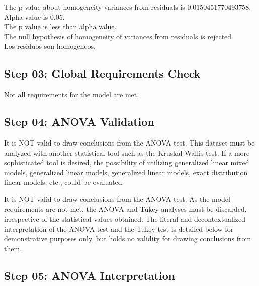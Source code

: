 \documentclass[
  letterpaper,
  DIV=11,
  numbers=noendperiod]{scrartcl}
\begin{document}
The p value about homogeneity variances from residuals is
0.0150451770493758.\\
Alpha value is 0.05.\\
The p value is less than alpha value.\\
The null hypothesis of homogeneity of variances from residuals is
rejected.\\
Los residuos son homogeneos.

\subsection{\texorpdfstring{\textbf{Step 03:} Global Requirements
Check}{Step 03: Global Requirements Check}}\label{step-03-global-requirements-check}

Not all requirements for the model are met.

\subsection{\texorpdfstring{\textbf{Step 04:} ANOVA
Validation}{Step 04: ANOVA Validation}}\label{step-04-anova-validation}

It is NOT valid to draw conclusions from the ANOVA test. This dataset
must be analyzed with another statistical tool such as the
Kruskal-Wallis test. If a more sophisticated tool is desired, the
possibility of utilizing generalized linear mixed models, generalized
linear models, generalized linear models, exact distribution linear
models, etc., could be evaluated.

It is NOT valid to draw conclusions from the ANOVA test. As the model
requirements are not met, the ANOVA and Tukey analyses must be
discarded, irrespective of the statistical values obtained. The literal
and decontextualized interpretation of the ANOVA test and the Tukey test
is detailed below for demonstrative purposes only, but holds no validity
for drawing conclusions from them.

\subsection{\texorpdfstring{\textbf{Step 05:} ANOVA
Interpretation}{Step 05: ANOVA Interpretation}}\label{step-05-anova-interpretation}
\end{document}
